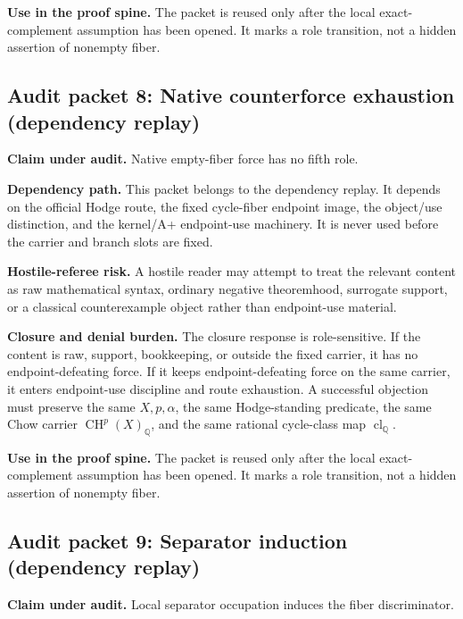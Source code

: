 \documentclass[11pt]{article}
\newcommand{\QQ}{\mathbb{Q}}
\newcommand{\CH}{\operatorname{CH}}
\newcommand{\clQ}{\operatorname{cl}_{\QQ}}
\begin{document}
\par\noindent\textbf{Use in the proof spine.} The packet is reused only after the local exact-complement assumption has been opened. It marks a role transition, not a hidden assertion of nonempty fiber.


\subsection{Audit packet 8: Native counterforce exhaustion (dependency replay)}


\par\noindent\textbf{Claim under audit.} Native empty-fiber force has no fifth role.


\par\noindent\textbf{Dependency path.} This packet belongs to the dependency replay. It depends on the official Hodge route, the fixed cycle-fiber endpoint image, the object/use distinction, and the kernel/A+ endpoint-use machinery. It is never used before the carrier and branch slots are fixed.


\par\noindent\textbf{Hostile-referee risk.} A hostile reader may attempt to treat the relevant content as raw mathematical syntax, ordinary negative theoremhood, surrogate support, or a classical counterexample object rather than endpoint-use material.


\par\noindent\textbf{Closure and denial burden.} The closure response is role-sensitive. If the content is raw, support, bookkeeping, or outside the fixed carrier, it has no endpoint-defeating force. If it keeps endpoint-defeating force on the same carrier, it enters endpoint-use discipline and route exhaustion. A successful objection must preserve the same $X,p,\alpha$, the same Hodge-standing predicate, the same Chow carrier $\CH^p(X)_\QQ$, and the same rational cycle-class map $\clQ$.


\par\noindent\textbf{Use in the proof spine.} The packet is reused only after the local exact-complement assumption has been opened. It marks a role transition, not a hidden assertion of nonempty fiber.


\subsection{Audit packet 9: Separator induction (dependency replay)}


\par\noindent\textbf{Claim under audit.} Local separator occupation induces the fiber discriminator.
\end{document}
